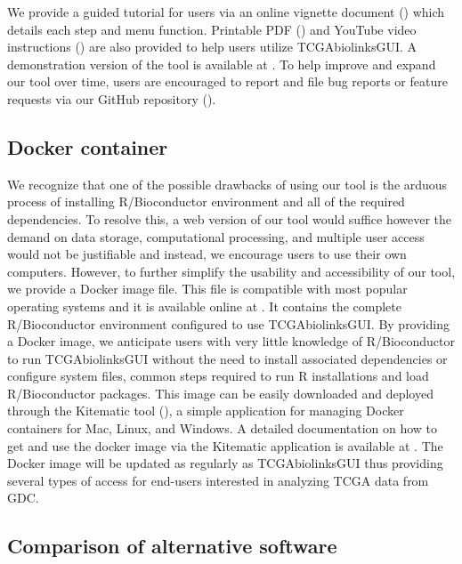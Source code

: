 We provide a guided tutorial for users via an online vignette document () which details each step and menu function. Printable PDF () and YouTube video instructions () are also provided to help users utilize TCGAbiolinksGUI. A demonstration version of the tool is available at . To help improve and expand our tool over time, users are encouraged to report and file bug reports or feature requests via our GitHub repository ().



\subsection{Docker container}


We recognize that one of the possible drawbacks of using our tool is the arduous process of installing R/Bioconductor environment and all of the required dependencies. To resolve this, a web version of our tool would suffice however the demand on data storage, computational processing, and multiple user access would not be justifiable and instead, we encourage users to use their own computers. However, to further simplify the usability and accessibility of our tool, we provide a Docker image file. This file is compatible with most popular operating systems and it is available online at . It contains the complete R/Bioconductor environment configured to use TCGAbiolinksGUI. By providing a Docker image, we anticipate users with very little knowledge of R/Bioconductor to run TCGAbiolinksGUI without the need to install associated dependencies or configure system files, common steps required to run R installations and load R/Bioconductor packages.  This image can be easily downloaded and deployed through the Kitematic tool (), a simple application for managing Docker containers for Mac, Linux, and Windows. A detailed documentation on how to get and use the docker image via the Kitematic application is available at
. The Docker image will be updated as regularly as TCGAbiolinksGUI thus providing several types of access for end-users interested in analyzing TCGA data from GDC.



\subsection{Comparison of alternative software}


